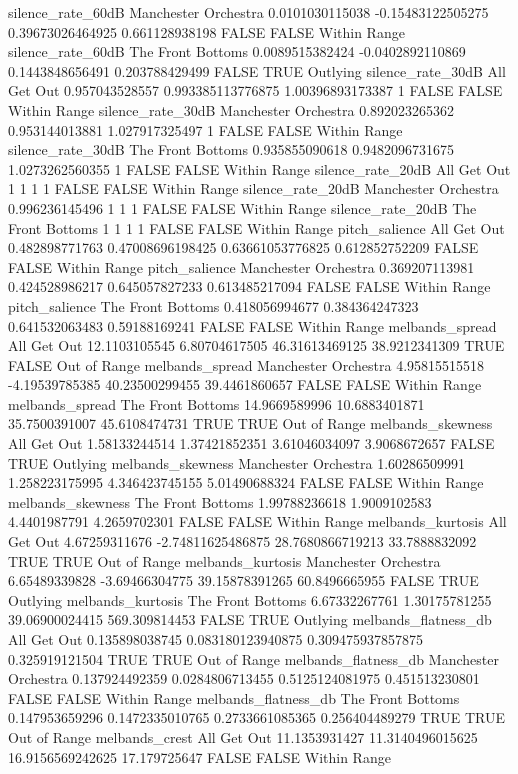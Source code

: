 silence_rate_60dB Manchester Orchestra 0.0101030115038 -0.15483122505275 0.39673026464925 0.661128938198 FALSE FALSE Within Range
silence_rate_60dB The Front Bottoms 0.0089515382424 -0.0402892110869 0.1443848656491 0.203788429499 FALSE TRUE Outlying
silence_rate_30dB All Get Out 0.957043528557 0.993385113776875 1.00396893173387 1 FALSE FALSE Within Range
silence_rate_30dB Manchester Orchestra 0.892023265362 0.953144013881 1.027917325497 1 FALSE FALSE Within Range
silence_rate_30dB The Front Bottoms 0.935855090618 0.9482096731675 1.0273262560355 1 FALSE FALSE Within Range
silence_rate_20dB All Get Out 1 1 1 1 FALSE FALSE Within Range
silence_rate_20dB Manchester Orchestra 0.996236145496 1 1 1 FALSE FALSE Within Range
silence_rate_20dB The Front Bottoms 1 1 1 1 FALSE FALSE Within Range
pitch_salience All Get Out 0.482898771763 0.47008696198425 0.63661053776825 0.612852752209 FALSE FALSE Within Range
pitch_salience Manchester Orchestra 0.369207113981 0.424528986217 0.645057827233 0.613485217094 FALSE FALSE Within Range
pitch_salience The Front Bottoms 0.418056994677 0.384364247323 0.641532063483 0.59188169241 FALSE FALSE Within Range
melbands_spread All Get Out 12.1103105545 6.80704617505 46.31613469125 38.9212341309 TRUE FALSE Out of Range
melbands_spread Manchester Orchestra 4.95815515518 -4.19539785385 40.23500299455 39.4461860657 FALSE FALSE Within Range
melbands_spread The Front Bottoms 14.9669589996 10.6883401871 35.7500391007 45.6108474731 TRUE TRUE Out of Range
melbands_skewness All Get Out 1.58133244514 1.37421852351 3.61046034097 3.9068672657 FALSE TRUE Outlying
melbands_skewness Manchester Orchestra 1.60286509991 1.258223175995 4.346423745155 5.01490688324 FALSE FALSE Within Range
melbands_skewness The Front Bottoms 1.99788236618 1.9009102583 4.4401987791 4.2659702301 FALSE FALSE Within Range
melbands_kurtosis All Get Out 4.67259311676 -2.74811625486875 28.7680866719213 33.7888832092 TRUE TRUE Out of Range
melbands_kurtosis Manchester Orchestra 6.65489339828 -3.69466304775 39.15878391265 60.8496665955 FALSE TRUE Outlying
melbands_kurtosis The Front Bottoms 6.67332267761 1.30175781255 39.06900024415 569.309814453 FALSE TRUE Outlying
melbands_flatness_db All Get Out 0.135898038745 0.083180123940875 0.309475937857875 0.325919121504 TRUE TRUE Out of Range
melbands_flatness_db Manchester Orchestra 0.137924492359 0.0284806713455 0.5125124081975 0.451513230801 FALSE FALSE Within Range
melbands_flatness_db The Front Bottoms 0.147953659296 0.1472335010765 0.2733661085365 0.256404489279 TRUE TRUE Out of Range
melbands_crest All Get Out 11.1353931427 11.3140496015625 16.9156569242625 17.179725647 FALSE FALSE Within Range
